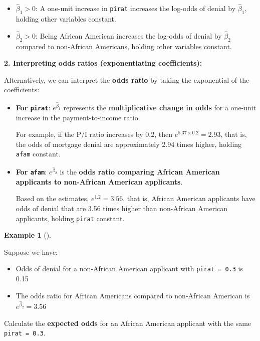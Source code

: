 \documentclass[
  12pt,
  letterpaper,
]{scrbook}
\providecommand{\tightlist}{%
  \setlength{\itemsep}{0pt}\setlength{\parskip}{0pt}}
\renewcommand{\tightlist}{\setlength{\itemsep}{0.5\baselineskip}\setlength{\parskip}{0.2\baselineskip}}
\theoremstyle{plain}
\theoremstyle{definition}
\newtheorem{example}{Example}[chapter]
\theoremstyle{remark}
\begin{document}
\begin{itemize}
\tightlist
\item
  \(\hat{\beta}_1 > 0\): A one-unit increase in \texttt{pirat} increases
  the log-odds of denial by \(\hat{\beta}_1\), holding other variables
  constant.
\item
  \(\hat{\beta}_2 > 0\): Being African American increases the log-odds
  of denial by \(\hat{\beta}_2\) compared to non-African Americans,
  holding other variables constant.
\end{itemize}

\textbf{2. Interpreting odds ratios (exponentiating coefficients):}

Alternatively, we can interpret the \textbf{odds ratio} by taking the
exponential of the coefficients:

\begin{itemize}
\item
  \textbf{For \texttt{pirat}}: \(e^{\hat{\beta}_1}\) represents the
  \textbf{multiplicative change in odds} for a one-unit increase in the
  payment-to-income ratio.

  For example, if the P/I ratio increases by 0.2, then
  \(e^{5.37\times 0.2} = 2.93\), that is, the odds of mortgage denial
  are approximately 2.94 times higher, holding \texttt{afam} constant.
\item
  \textbf{For \texttt{afam}}: \(e^{\hat{\beta}_2}\) is the \textbf{odds
  ratio comparing African American applicants to non-African American
  applicants}.

  Based on the estimates, \(e^{1.2} = 3.56\), that is, African American
  applicants have odds of denial that are 3.56 times higher than
  non-African American applicants, holding \texttt{pirat} constant.
\end{itemize}

\begin{example}[]\protect\hypertarget{exm-2}{}\label{exm-2}

Suppose we have:

\begin{itemize}
\tightlist
\item
  Odds of denial for a non-African American applicant with
  \texttt{pirat\ =\ 0.3} is 0.15
\item
  The odds ratio for African Americans compared to non-African American
  is \(e^{\hat{\beta}_2} = 3.56\)
\end{itemize}

Calculate the \textbf{expected odds} for an African American applicant
with the same \texttt{pirat\ =\ 0.3}.

\end{example}
\end{document}
